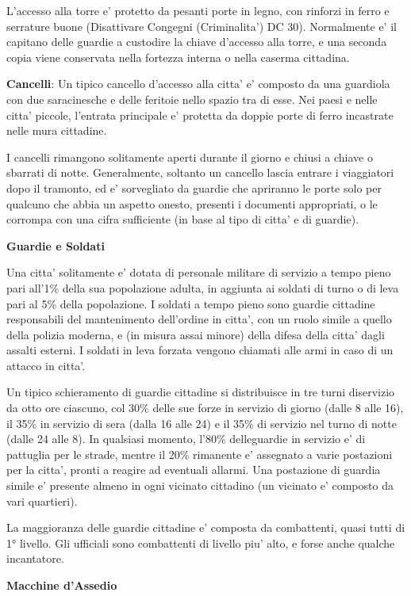 \documentclass[a4paper,11pt,twoside,openany]{dndbook}
\begin{document}
L'accesso alla torre e' protetto da pesanti porte in legno, con rinforzi in ferro e serrature buone (Disattivare Congegni (Criminalita') DC 30). Normalmente e' il capitano delle guardie a custodire la chiave d'accesso alla torre, e una seconda copia viene conservata nella fortezza interna o nella caserma cittadina.

\textbf{Cancelli}: Un tipico cancello d'accesso alla citta' e' composto da una guardiola con due saracinesche e delle feritoie nello spazio tra di esse. Nei paesi e nelle citta' piccole, l'entrata principale e' protetta da doppie porte di ferro incastrate nelle mura cittadine.

I cancelli rimangono solitamente aperti durante il giorno e chiusi a chiave o sbarrati di notte. Generalmente, soltanto un cancello lascia entrare i viaggiatori dopo il tramonto, ed e' sorvegliato da guardie che apriranno le porte solo per qualcuno che abbia un aspetto onesto, presenti i documenti appropriati, o le corrompa con una cifra sufficiente (in base al tipo di citta' e di guardie).

\textbf{Guardie e Soldati}

Una citta' solitamente e' dotata di personale militare di servizio a tempo pieno pari all'1\% della sua popolazione adulta, in aggiunta ai soldati di turno o di leva pari al 5\% della popolazione. I soldati a tempo pieno sono guardie cittadine responsabili del mantenimento dell'ordine in citta', con un ruolo simile a quello della polizia moderna, e (in misura assai minore) della difesa della citta' dagli assalti esterni. I soldati in leva forzata vengono chiamati alle armi in caso di un attacco in citta'.

Un tipico schieramento di guardie cittadine si distribuisce in tre turni diservizio da otto ore ciascuno, col 30\% delle sue forze in servizio di giorno (dalle 8 alle 16), il 35\% in servizio di sera (dalla 16 alle 24) e il 35\% di servizio nel turno di notte (dalle 24 alle 8). In qualsiasi momento, l'80\% delleguardie in servizio e' di pattuglia per le strade, mentre il 20\% rimanente e' assegnato a varie postazioni per la citta', pronti a reagire ad eventuali allarmi. Una postazione di guardia simile e' presente almeno in ogni vicinato cittadino (un vicinato e' composto da vari quartieri).

La maggioranza delle guardie cittadine e' composta da combattenti, quasi tutti di 1° livello. Gli ufficiali sono combattenti di livello piu' alto, e forse anche qualche incantatore.

\textbf{Macchine d'Assedio}
\end{document}
